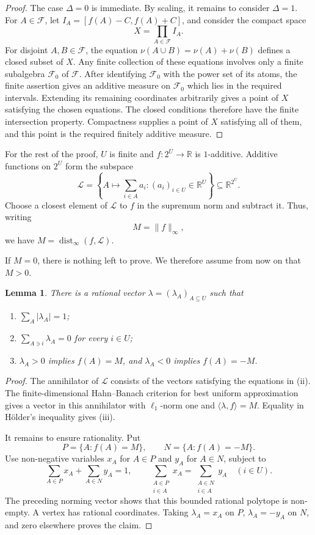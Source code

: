 \documentclass[11pt,a4paper]{amsart}
\newtheorem{lemma}[theorem]{Lemma}
\DeclareMathOperator{\dist}{dist}
\newcommand{\cF}{\mathcal F}
\newcommand{\cL}{\mathcal L}
\newcommand{\RR}{\mathbb R}
\begin{document}
\begin{proof}
The case \(\Delta=0\) is immediate.  By scaling, it remains to consider
\(\Delta=1\).  For \(A\in\cF\), let
\(I_A=[f(A)-C,f(A)+C]\), and consider the compact space
\[
        X=\prod_{A\in\cF}I_A.
\]
For disjoint \(A,B\in\cF\), the equation
\(\nu(A\cup B)=\nu(A)+\nu(B)\) defines a closed subset of \(X\).  Any
finite collection of these equations involves only a finite subalgebra
\(\cF_0\) of \(\cF\).  After identifying \(\cF_0\) with the power set of
its atoms, the finite assertion gives an additive measure on \(\cF_0\) which
lies in the required intervals.  Extending its remaining coordinates
arbitrarily gives a point of \(X\) satisfying the chosen equations.  The
closed conditions therefore have the finite intersection property.
Compactness supplies a point of \(X\) satisfying all of them, and this point
is the required finitely additive measure.
\end{proof}

For the rest of the proof, \(U\) is finite and \(f\colon2^U\to\RR\) is
\(1\)-additive.  Additive functions on \(2^U\) form the subspace
\[
 \cL=\left\{A\longmapsto\sum_{i\in A}a_i:(a_i)_{i\in U}\in\RR^U\right\}
 \subseteq\RR^{2^U}.
\]
Choose a closest element of \(\cL\) to \(f\) in the supremum norm and
subtract it.  Thus, writing
\[
        M=\lVert f\rVert_\infty,
\]
we have \(M=\dist_\infty(f,\cL)\).

If \(M=0\), there is nothing left to prove.  We therefore assume from now on
that \(M>0\).

\begin{lemma}\label{lem:norming-vector}
There is a rational vector \(\lambda=(\lambda_A)_{A\subseteq U}\) such
that
\begin{enumerate}[label=\textup{(\roman*)}]
\item \(\sum_A\lvert\lambda_A\rvert=1\);
\item \(\sum_{A\ni i}\lambda_A=0\) for every \(i\in U\);
\item \(\lambda_A>0\) implies \(f(A)=M\), and \(\lambda_A<0\) implies
      \(f(A)=-M\).
\end{enumerate}
\end{lemma}

\begin{proof}
The annihilator of \(\cL\) consists of the vectors satisfying the equations
in (ii).  The finite-dimensional Hahn--Banach criterion for best uniform
approximation gives a vector in this annihilator with \(\ell_1\)-norm one and
\(\langle\lambda,f\rangle=M\).  Equality in H\"older's inequality gives
(iii).

It remains to ensure rationality.  Put
\[
 P=\{A:f(A)=M\},\qquad N=\{A:f(A)=-M\}.
\]
Use non-negative variables \(x_A\) for \(A\in P\) and \(y_A\) for
\(A\in N\), subject to
\[
 \sum_{A\in P}x_A+\sum_{A\in N}y_A=1,
 \qquad
 \sum_{\substack{A\in P\\ i\in A}}x_A
 =\sum_{\substack{A\in N\\ i\in A}}y_A \quad(i\in U).
\]
The preceding norming vector shows that this bounded rational polytope is
non-empty.  A vertex has rational coordinates.  Taking \(\lambda_A=x_A\)
on \(P\), \(\lambda_A=-y_A\) on \(N\), and zero elsewhere proves the
claim.
\end{proof}
\end{document}
